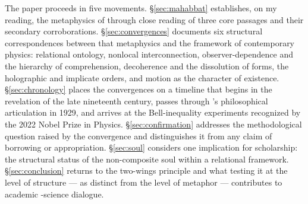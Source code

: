 The paper proceeds in five movements.
\S\ref{sec:mahabbat} establishes, on my reading, the \bahai metaphysics of \mahabbat through
close reading of three core passages and their secondary corroborations.
\S\ref{sec:convergences} documents six structural correspondences between that
metaphysics and the framework of contemporary physics: relational ontology,
nonlocal interconnection, observer-dependence and the hierarchy of
comprehension, decoherence and the dissolution of forms, the holographic and
implicate orders, and motion as the character of existence.
\S\ref{sec:chronology} places the convergences on a timeline that begins in
the \bahai revelation of the late nineteenth century, passes through
\citeauthor{Whitehead1929}'s philosophical articulation in 1929, and arrives
at the Bell-inequality experiments recognized by the 2022 Nobel Prize in Physics.
\S\ref{sec:confirmation} addresses the methodological question raised by the
convergence and distinguishes it from any claim of borrowing or appropriation.
\S\ref{sec:soul} considers one implication for \bahai scholarship: the
structural status of the non-composite soul within a relational framework.
\S\ref{sec:conclusion} returns to the two-wings principle and what testing it
at the level of structure --- as distinct from the level of
metaphor --- contributes to academic \bahai-science dialogue.
